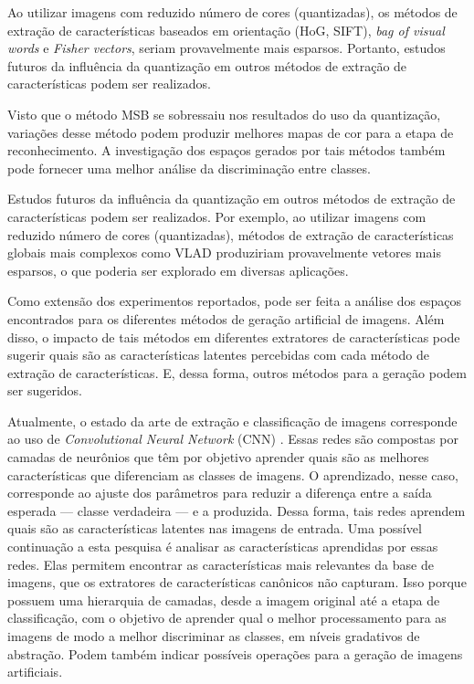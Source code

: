 Ao utilizar imagens com reduzido número de cores (quantizadas), os métodos de extração de características baseados em orientação (HoG, SIFT), \textit{bag of visual words} e \textit{Fisher vectors}, seriam provavelmente mais esparsos. Portanto, estudos futuros da influência da quantização em outros métodos de extração de características podem ser realizados.

Visto que o método MSB se sobressaiu nos resultados do uso da quantização, variações desse método podem produzir melhores mapas de cor para a etapa de reconhecimento. A investigação dos espaços gerados por tais métodos também pode fornecer uma melhor análise da discriminação entre classes.

Estudos futuros da influência da quantização em outros métodos de extração de características podem ser realizados. Por exemplo, ao utilizar imagens com reduzido número de cores (quantizadas), métodos de extração de características globais mais complexos como VLAD produziriam provavelmente vetores mais esparsos, o que poderia ser explorado em diversas aplicações.

Como extensão dos experimentos reportados, pode ser feita a análise dos espaços encontrados para os diferentes métodos de geração artificial de imagens. Além disso, o impacto de tais métodos em diferentes extratores de características pode sugerir quais são as características latentes percebidas com cada método de extração de características. E, dessa forma, outros métodos para a geração podem ser sugeridos.

Atualmente, o estado da arte de extração e classificação de imagens corresponde ao uso de \textit{Convolutional Neural Network} (CNN) \cite{Schmidhuber2014}. Essas redes são compostas por camadas de neurônios que têm por objetivo aprender quais são as melhores características que diferenciam as classes de imagens. O aprendizado, nesse caso, corresponde ao ajuste dos parâmetros para reduzir a diferença entre a saída esperada --- classe verdadeira --- e a produzida. Dessa forma, tais redes aprendem quais são as características latentes nas imagens de entrada. Uma possível continuação a esta pesquisa é analisar as características aprendidas por essas redes. Elas permitem encontrar as características mais relevantes da base de imagens, que os extratores de características canônicos não capturam. Isso porque possuem uma hierarquia de camadas, desde a imagem original até a etapa de classificação, com o objetivo de aprender qual o melhor processamento para as imagens de modo a melhor discriminar as classes, em níveis gradativos de abstração. Podem também indicar possíveis operações para a geração de imagens artificiais.

